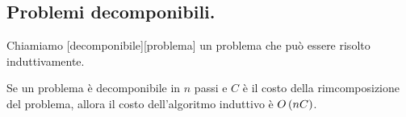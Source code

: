 \subsection{Problemi decomponibili.}
\label{AlgoritmiEStruttureDiDati_ProblemiDecomponibili}
\begin{Definition}
	Chiamiamo [decomponibile][problema] un problema che pu\`o essere risolto induttivamente.
\end{Definition}
\begin{Theorem}
	Se un problema \`e decomponibile in $n$ passi e $C$ \`e il costo della rimcomposizione del problema, allora il costo dell'algoritmo induttivo \`e $O \left ( n C \right )$.
\end{Theorem}
\begin{listing}
	\caption{Implementazione generica di un algoritmo per la risoluzione di un problema decomponibile in .}
\end{listing}
